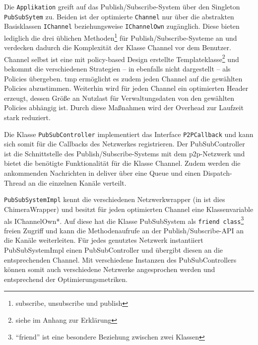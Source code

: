 Die \texttt{Applikation} greift auf das Publish/Subscribe-System über den Singleton \texttt{PubSub\-Sytem} zu. Beiden ist der optimierte \texttt{Channel} nur über die abstrakten Basisklassen \texttt{IChannel} beziehungsweise \texttt{IChannelOwn} zugänglich. Diese bieten lediglich die drei üblichen Methoden\footnote{subscribe, unsubscribe und publish} für Publish/Subscribe-Systeme an und verdecken dadurch die Komplexität der Klasse Channel vor dem Benutzer. Channel selbst ist eine mit policy-based Design erstellte Templateklasse\footnote{siehe  im Anhang zur Erklärung} und bekommt die verschiedenen Strategien -- in  ebenfalls nicht dargestellt -- als Policies übergeben. \ac{tmp} ermöglicht es zudem jeden Channel auf die gewählten Policies abzustimmen. Weiterhin wird für jeden Channel ein optimierten Header erzeugt, dessen Größe an Nutzlast für Verwaltungsdaten von den gewählten Policies abhängig ist. Durch diese Maßnahmen wird der Overhead zur Laufzeit stark reduziert. 

Die Klasse \texttt{PubSubController} implementiert das Interface \texttt{P2PCallback} und kann sich somit für die Callbacks des Netzwerkes registrieren. Der PubSubController ist die Schnittstelle des Publish/Subscribe-Systems mit dem \ac{p2p}-Netzwerk und bietet die benötigte Funktionalität für die Klasse Channel. Zudem werden die ankommenden Nachrichten in deliver über eine Queue und einen Dispatch-Thread an die einzelnen Kanäle verteilt. 

\texttt{PubSubSystemImpl} kennt die verschiedenen Netzwerkwrapper (in  ist dies ChimeraWrapper) und besitzt für jeden optimierten Channel eine Klassenvariable als IChannelOwn*. Auf diese hat die Klasse PubSubSystem als \texttt{friend class}\footnote{``friend'' ist eine besondere Beziehung zwischen zwei Klassen} freien Zugriff und kann die Methodenaufrufe an der Publish/Subscribe-API an die Kanäle weiterleiten. Für jedes genutztes Netzwerk instantiiert PubSubSystemImpl einen PubSubController und übergibt diesen an die entsprechenden Channel. Mit verschiedene Instanzen des PubSubControllers können somit auch verschiedene Netzwerke angesprochen werden und entsprechend der Optimierungsmetriken.\\

